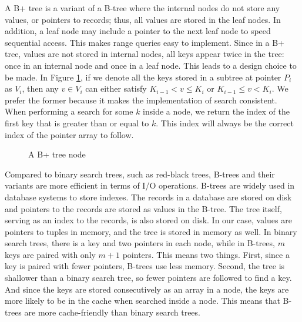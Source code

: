 \documentclass[11pt]{report}
\theoremstyle{definition}
\begin{document}
A B+ tree is a variant of a B-tree where the internal nodes do not store any values, or pointers to records; thus, all values are stored in the leaf nodes. In addition, a leaf node may include a pointer to the next leaf node to speed sequential access. This makes range queries easy to implement. Since in a B+ tree, values are not stored in internal nodes, all keys appear twice in the tree: once in an internal node and once in a leaf node. This leads to a design choice to be made. In Figure \ref{fig:btree_node}, if we denote all the keys stored in a subtree at pointer $P_i$ as $V_i$, then any $v \in V_i$ can either satisfy $K_{i-1} < v \leq K_i$ or $K_{i-1} \leq v < K_i$. We prefer the former because it makes the implementation of search consistent. When performing a search for some $k$ inside a node, we return the index of the first key that is greater than or equal to $k$. This index will always be the correct index of the pointer array to follow.

\begin{figure}[h]
  \centering
  \vspace{0.5em}
  \caption{A B+ tree node}
  \label{fig:btree_node}
\end{figure}

Compared to binary search trees, such as red-black trees, B-trees and their variants are more efficient in terms of I/O operations. B-trees are widely used in database systems to store indexes. The records in a database are stored on disk and pointers to the records are stored as values in the B-tree. The tree itself, serving as an index to the records, is also stored on disk. In our case, values are pointers to tuples in memory, and the tree is stored in memory as well. In binary search trees, there is a key and two pointers in each node, while in B-trees, $m$ keys are paired with only $m+1$ pointers. This means two things. First, since a key is paired with fewer pointers, B-trees use less memory. Second, the tree is shallower than a binary search tree, so fewer pointers are followed to find a key. And since the keys are stored consecutively as an array in a node, the keys are more likely to be in the cache when searched inside a node. This means that B-trees are more cache-friendly than binary search trees.
\end{document}
